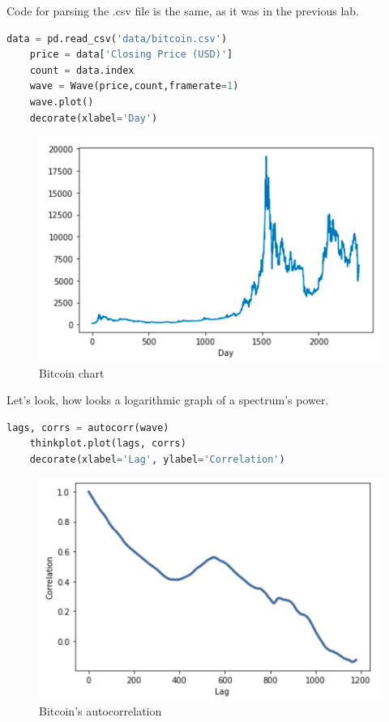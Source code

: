 \documentclass[a4paper]{article}
\begin{document}
        Code for parsing the .csv file is the same, as it was in the previous lab.
        
        \begin{lstlisting}[language=Python,caption=Bitcoin to a wave,label={lst:als_sqr}]
    data = pd.read_csv('data/bitcoin.csv')
    price = data['Closing Price (USD)']
    count = data.index
    wave = Wave(price,count,framerate=1)
    wave.plot()
    decorate(xlabel='Day')
        \end{lstlisting}
            
        \begin{figure}[H]
            \centering
            \includegraphics[width=\textwidth]{img/btc.png}
            \caption{Bitcoin chart}
            \label{fig:als_sqr}
        \end{figure}
        
        Let's look, how looks a logarithmic graph of a spectrum's power.
        
        \begin{lstlisting}[language=Python,caption=Bitcoin autocorrelation estimation,label={lst:als_sqr}]
    lags, corrs = autocorr(wave)
    thinkplot.plot(lags, corrs)
    decorate(xlabel='Lag', ylabel='Correlation')
        \end{lstlisting}
        
        \begin{figure}[H]
            \centering
            \includegraphics[width=\textwidth]{img/btc_corr.png}
            \caption{Bitcoin's autocorrelation}
            \label{fig:als_clr}
        \end{figure}
            
\end{document}
